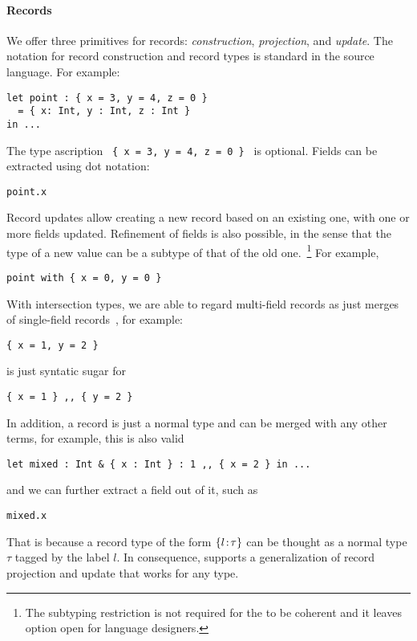 {%

\paragraph{Records}




We offer three primitives for records: \emph{construction}, \emph{projection},
and \emph{update}. The notation for record construction and record types is
standard in the source language. For example:
\begin{lstlisting}
let point : { x = 3, y = 4, z = 0 } 
  = { x: Int, y : Int, z : Int } 
in ...
\end{lstlisting}
The type ascription \lstinline$ { x = 3, y = 4, z = 0 } $ is optional. Fields
can be extracted using dot notation:
\begin{lstlisting}
point.x
\end{lstlisting}
Record updates allow creating a new record based on an existing one, with one or
more fields updated. Refinement of fields is also possible, in the sense that
the type of a new value can be a subtype of that of the old one.~\footnote{The
  subtyping restriction is not required for the \name to be coherent and it
  leaves option open for language designers.} For example,
\begin{lstlisting}
point with { x = 0, y = 0 }
\end{lstlisting}

With intersection types, we are able to regard multi-field records as just
merges of single-field records~\cite{}, for example:
\begin{lstlisting}
{ x = 1, y = 2 }
\end{lstlisting}
is just syntatic sugar for
\begin{lstlisting}
{ x = 1 } ,, { y = 2 }
\end{lstlisting}
In addition, a record is just a normal type and can be merged with any other
terms, for example, this is also valid
\begin{lstlisting}
let mixed : Int & { x : Int } : 1 ,, { x = 2 } in ...
\end{lstlisting}
and we can further extract a field out of it, such as
\begin{lstlisting}
mixed.x
\end{lstlisting}
That is because a record type of the form $ \{ l \!:\! \tau \} $ can be thought as a
normal type $ \tau $ tagged by the label $ l $. In consequence, \name supports a
generalization of record projection and update that works for any type.

}
